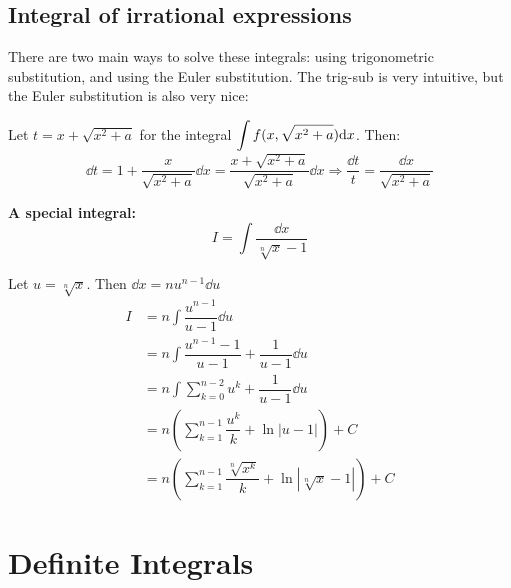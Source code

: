 \documentclass[12pt]{article}
\begin{document}
\subsection{Integral of irrational expressions}
\par There are two main ways to solve these integrals: using trigonometric substitution, and using the Euler substitution. The trig-sub is very intuitive, but the Euler substitution is also very nice:
\begin{concept}
    Let $t = x + \sqrt{x^2 + a}$ for the integral $\mathlarger{\int f(x, \sqrt{x^2 +a}) \dd x}$. Then: 
    \begin{equation*}
        \dd t = 1 + \dfrac{x} {\sqrt{x^2 + a}} \dd x = \dfrac{x + \sqrt{x^2 +a }} {\sqrt{x^2 +a}} \dd x \Rightarrow \dfrac{\dd t}{t} = \dfrac{\dd x}{\sqrt{x^2 + a}}
    \end{equation*}
\end{concept}
\begin{important}
    \textbf{A special integral:}
    \begin{equation*}
        I   = \int \dfrac{\dd x}{\sqrt[n]{x}-1} 
    \end{equation*}
    \par Let $u = \sqrt[n]{x}$. Then $\dd x = n u^{n-1} \dd u$
    \begin{align*}
        I &= n \int \dfrac{u^{n-1}}{u-1}\dd u \\
        &= n \int \dfrac{u^{n-1} - 1}{u-1} + \dfrac{1}{u-1} \dd u \\
        &= n \int \sum_{k=0}^{n-2}u^k + \dfrac{1}{u-1}\dd u \\
        & = n\left(\sum_{k=1}^{n-1} \dfrac{u^k}{k} + \ln{|u-1|} \right) + C \\
        & = n\left(\sum_{k=1}^{n-1} \dfrac{\sqrt[n]{x^k}}{k} + \ln{|\sqrt[n]{x}-1|} \right) + C
    \end{align*}
\end{important}
\section{Definite Integrals}
\end{document}
